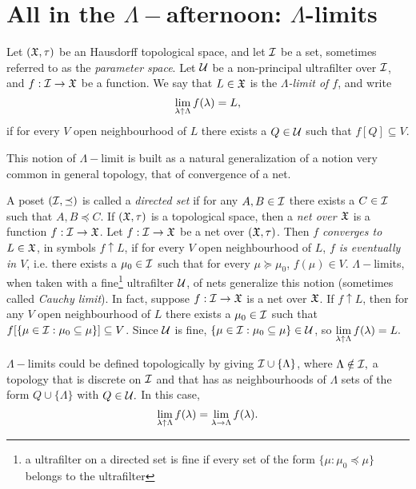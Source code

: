 \documentclass[draft.tex]{subfiles}
\begin{document}
\section{All in the $\Lambda-$afternoon: $\Lambda$-limits}
\begin{definition}
\label{def:lambdalim}
Let $(\mathfrak{X}, \tau)$ be an Hausdorff topological space, and let $\mathcal{I}$ be a set, sometimes referred to as the \emph{parameter space}. Let $\mathcal{U}$ be a non-principal ultrafilter over $\mathcal{I}$, and $f: \mathcal{I} \to \mathfrak{X}$ be a function. We say that $L \in \mathfrak{X}$ is the \emph{$\Lambda$-limit of $f$}, and write
\begin{equation*}
    \lim\limits_{\lambda \uparrow \Lambda}{f(\lambda)} = L,
\end{equation*}
if for every $V$ open neighbourhood of $L$ there exists a $Q \in \mathcal{U}$ such that $f[Q] \subseteq V.$
\end{definition}
This notion of $\Lambda-$limit is built as a natural generalization of a notion very common in general topology, that of convergence of a net.
\begin{remark}
A poset $(\mathcal{I}, \preceq)$ is called a \emph{directed set} if for any $A, B \in \mathcal{I}$ there exists a $C \in \mathcal{I}$ such that $A, B \preceq C.$ If $(\mathfrak{X}, \tau)$ is a topological space, then a \emph{net over $\mathfrak{X}$} is a function $f: \mathcal{I} \to \mathfrak{X}$. Let $f: \mathcal{I} \to \mathfrak{X}$ be a net over $(\mathfrak{X}, \tau)$. Then \emph{$f$ converges to $L \in \mathfrak{X}$}, in symbols $f \uparrow L$, if for every $V$ open neighbourhood of $L$, \emph{$f$ is eventually in $V$}, i.e. there exists a $\mu_0 \in \mathcal{I}$ such that for every $\mu \succeq \mu_0$, $f(\mu) \in V.$ $\Lambda-$limits, when taken with a fine\footnote{a ultrafilter on a directed set is fine if every set of the form $\{\mu: \mu_0 \preceq \mu\}$ belongs to the ultrafilter} ultrafilter $\mathcal{U}$, of nets generalize this notion (sometimes called \emph{Cauchy limit}). In fact, suppose $f: \mathcal{I} \to \mathfrak{X}$ is a net over $\mathfrak{X}$. If $f \uparrow L$, then for any $V$ open neighbourhood of $L$ there exists a $\mu_0 \in \mathcal{I}$ such that $f[\{\mu \in \mathcal{I}: \mu_0 \subseteq \mu\}] \subseteq V$. Since $\mathcal{U}$ is fine, $\{\mu \in \mathcal{I}: \mu_0 \subseteq \mu\} \in \mathcal{U}$, so $\lim\limits_{\lambda \uparrow \Lambda}{f(\lambda)} = L.$
\end{remark}
\begin{remark}
$\Lambda-$limits could be defined topologically by giving $\mathcal{I} \cup \{\Lambda\}$, where $\Lambda \notin \mathcal{I},$ a topology that is discrete on $\mathcal{I}$ and that has as neighbourhoods of $\Lambda$ sets of the form $Q \cup \{\Lambda\}$ with $Q \in \mathcal{U}.$ In this case,
\begin{equation*}
    \lim\limits_{\lambda \uparrow \Lambda}{f(\lambda)} = \lim\limits_{\lambda \to \Lambda} f(\lambda).
\end{equation*}
\end{remark}
\end{document}
